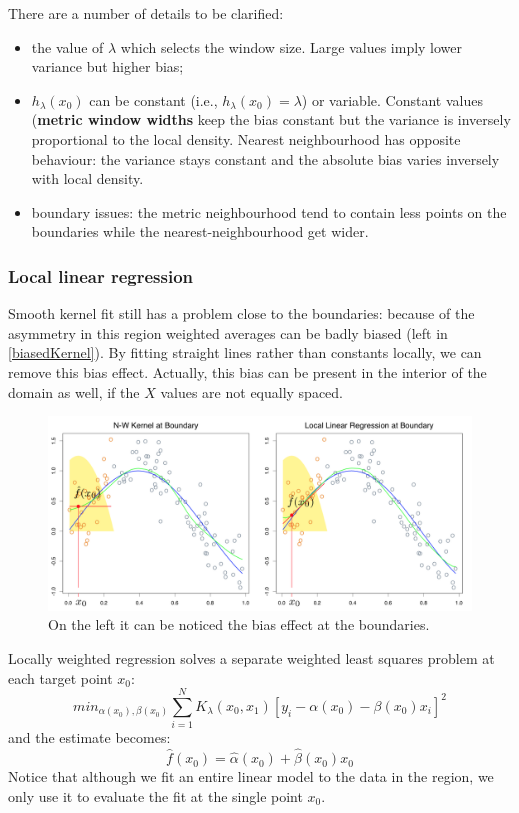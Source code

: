 \documentclass[12pt, letterpaper]{article}
\theoremstyle{definition}
\begin{document}
There are a number of details to be clarified:
\begin{itemize}
\item the value of $\lambda$ which selects the window size. Large values imply lower variance but higher bias;
\item $h_\lambda(x_0)$ can be constant (i.e., $h_\lambda(x_0)=\lambda$) or variable. Constant values (\textbf{metric window widths} keep the bias constant but the variance is inversely proportional to the local density. Nearest neighbourhood has opposite behaviour: the variance stays constant and the absolute bias varies inversely with local density.
\item boundary issues: the metric neighbourhood tend to contain less points on the boundaries while the nearest-neighbourhood get wider.
\end{itemize}

\subsubsection{Local linear regression}
Smooth kernel fit still has a problem close to the boundaries: because of the asymmetry in this region weighted averages can be badly biased (left in \autoref{biasedKernel}). By fitting straight lines rather than constants locally, we can remove this bias effect. Actually, this bias can be present in the interior of the domain as well, if the $X$ values are not equally spaced.
\begin{figure}
\includegraphics[scale=0.4]{img/biasedKernel}
\caption{On the left it can be noticed the bias effect at the boundaries.}
\label{biasedKernel}
\end{figure}
Locally weighted regression solves a separate weighted least squares problem at each target point $x_0$:
\begin{equation}
min_{\alpha(x_0), \beta(x_0)} \sum_{i=1}^N K_\lambda(x_0,x_1)\left[ y_i - \alpha(x_0) -\beta(x_0)x_i\right]^2
\end{equation}
and the estimate becomes:
\begin{equation}
\hat{f}(x_0) = \hat{\alpha}(x_0) + \hat{\beta}(x_0) x_0
\end{equation}
Notice that although we fit an entire linear model to the data in the region, we only use it to evaluate the fit at the single point $x_0$.
\end{document}
